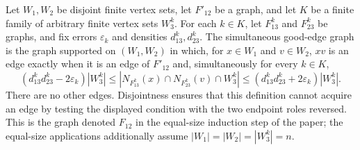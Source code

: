 \begin{definition}
Let $W_1,W_2$ be disjoint finite vertex sets, let $F'_{12}$ be a graph, and let $K$ be a finite family of arbitrary finite vertex sets $W_3^k$.  For each $k\in K$, let $F_{13}^k$ and $F_{23}^k$ be graphs, and fix errors $\varepsilon_k$ and densities $d_{13}^k,d_{23}^k$.  The simultaneous good-edge graph is the graph supported on $(W_1,W_2)$ in which, for $x\in W_1$ and $v\in W_2$, $xv$ is an edge exactly when it is an edge of $F'_{12}$ and, simultaneously for every $k\in K$,
\[
 (d_{13}^kd_{23}^k-2\varepsilon_k)|W_3^k|\leq
 |N_{F_{13}^k}(x)\cap N_{F_{23}^k}(v)\cap W_3^k|
 \leq(d_{13}^kd_{23}^k+2\varepsilon_k)|W_3^k|.
\]
There are no other edges.  Disjointness ensures that this definition cannot acquire an edge by testing the displayed condition with the two endpoint roles reversed.  This is the graph denoted $F_{12}$ in the equal-size induction step of the paper; the equal-size applications additionally assume $|W_1|=|W_2|=|W_3^k|=n$.
\end{definition}
